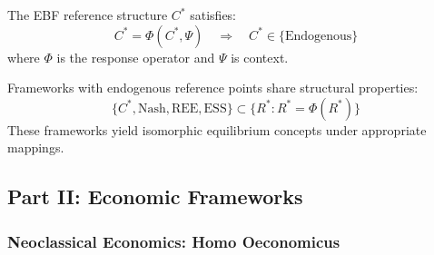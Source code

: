 \begin{axiom}
\label{ax:AY-bcm}
The EBF reference structure $C^*$ satisfies:
\begin{equation}
C^* = \Phi(C^*, \Psi) \quad \Rightarrow \quad C^* \in \{\text{Endogenous}\}
\end{equation}
where $\Phi$ is the response operator and $\Psi$ is context.
\end{axiom}

\begin{axiom}
\label{ax:AY-equivalence}
Frameworks with endogenous reference points share structural properties:
\begin{equation}
\{C^*, \text{Nash}, \text{REE}, \text{ESS}\} \subset \{R^*: R^* = \Phi(R^*)\}
\end{equation}
These frameworks yield isomorphic equilibrium concepts under appropriate mappings.
\end{axiom}



\subsection{Part II: Economic Frameworks}
\label{sec:AY-economics}

\subsubsection{Neoclassical Economics: Homo Oeconomicus}

